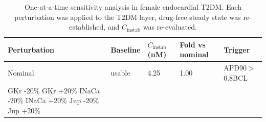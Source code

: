 \begin{table}[t]
\caption{One-at-a-time sensitivity analysis in female endocardial T2DM. Each perturbation was applied to the T2DM layer, drug-free steady state was re-established, and $C_{\mathrm{instab}}$ was re-evaluated.}
\centering
\begin{tabular}{lllll}
\hline
Perturbation & Baseline & $C_{\mathrm{instab}}$ (nM) & Fold vs nominal & Trigger \\
\hline
Nominal & usable & 4.25 & 1.00 & APD90$>$0.8BCL \\
GKr -20\%%
GKr +20\%%
INaCa -20\%%
INaCa +20\%%
Jup -20\%%
Jup +20\%%
\hline
\end{tabular}
\label{tab:oat_sensitivity}
\end{table}
